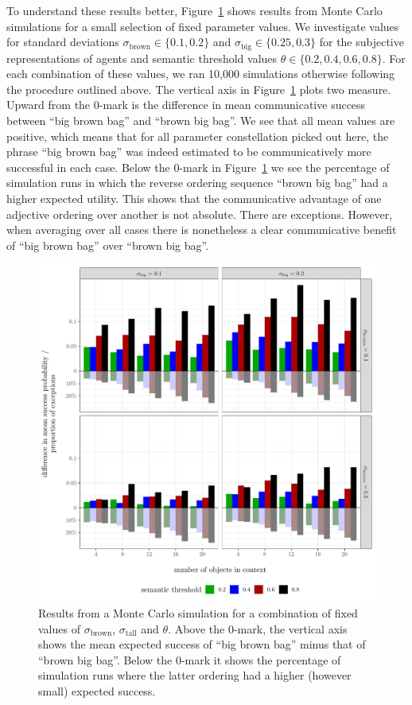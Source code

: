 \documentclass[10pt,a4paper]{article}
\begin{document}
To understand these results better, Figure~\ref{fig:Showcase_examples} shows results from Monte Carlo simulations for a small selection of fixed parameter values. We investigate values for standard deviations $\sigma_{\text{brown}} \in \{0.1, 0.2\}$ and $\sigma_{\text{big}} \in \{0.25, 0.3\}$ for the subjective representations of agents and semantic threshold values $\theta \in \{ 0.2, 0.4, 0.6, 0.8 \}$. For each combination of these values, we ran 10,000 simulations otherwise following the procedure outlined above. The vertical axis in Figure~\ref{fig:Showcase_examples} plots two measure. Upward from the 0-mark is the difference in mean communicative success between ``big brown bag'' and ``brown big bag''. We see that all mean values are positive, which means that for all parameter constellation picked out here, the phrase ``big brown bag'' was indeed estimated to be communicatively more successful in each case. Below the 0-mark in Figure~\ref{fig:Showcase_examples} we see the percentage of simulation runs in which the reverse ordering sequence ``brown big bag'' had a higher expected utility. This shows that the communicative advantage of one adjective ordering over another is not absolute. There are exceptions. However, when averaging over all cases there is nonetheless a clear communicative benefit of ``big brown bag'' over ``brown big bag''.

\begin{figure}
  \centering
  \includegraphics[width = \linewidth]{plots/showcase_results_combined.pdf}
  \caption{Results from a Monte Carlo simulation for a combination of fixed values of $\sigma_{\text{brown}}$, $\sigma_{\text{tall}}$ and $\theta$. Above the 0-mark, the vertical axis shows the mean expected success of ``big brown bag'' minus that of ``brown big bag''. Below the 0-mark it shows the percentage of simulation runs where the latter ordering had a higher (however small) expected success.}
  \label{fig:Showcase_examples}
\end{figure}
\end{document}
